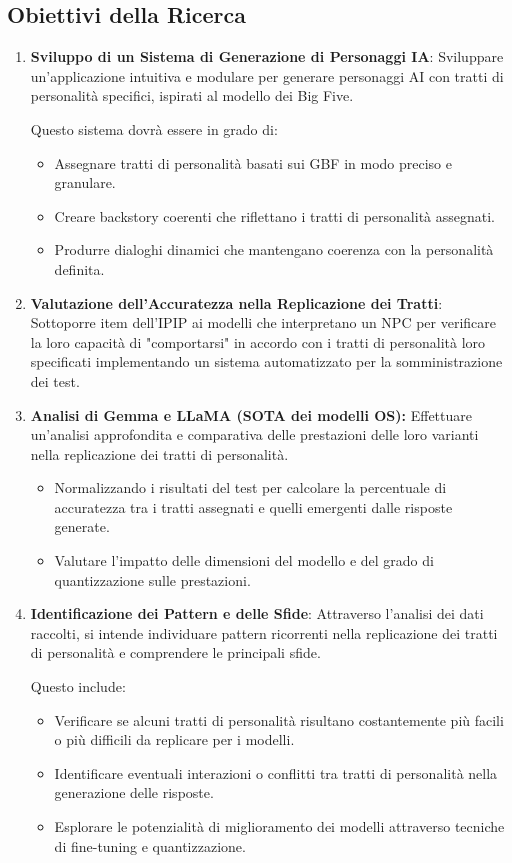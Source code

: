 \subsection{Obiettivi della Ricerca}
\begin{enumerate}
    \item 
    \textbf{Sviluppo di un Sistema di Generazione di Personaggi IA}:
    Sviluppare un'applicazione intuitiva e modulare per generare personaggi AI con tratti di personalità specifici, ispirati al modello dei Big Five.
    
    Questo sistema dovrà essere in grado di:
    \begin{itemize}
        \item Assegnare tratti di personalità basati sui GBF in modo preciso e granulare.
        \item Creare backstory coerenti che riflettano i tratti di personalità assegnati.
        \item Produrre dialoghi dinamici che mantengano coerenza con la personalità definita.
    \end{itemize}
    
    \item 
    \textbf{Valutazione dell'Accuratezza nella Replicazione dei Tratti}:
    Sottoporre item dell'IPIP ai modelli che interpretano un NPC per verificare la loro capacità di "comportarsi" in accordo con i tratti di personalità loro specificati implementando un sistema automatizzato per la somministrazione dei test.
    
    \item 
    \textbf{Analisi di Gemma e LLaMA (SOTA dei modelli OS):}
    Effettuare un'analisi approfondita e comparativa delle prestazioni delle loro varianti nella replicazione dei tratti di personalità.
    \begin{itemize}
        \item Normalizzando i risultati del test per calcolare la percentuale di accuratezza tra i tratti assegnati e quelli emergenti dalle risposte generate.
        \item Valutare l'impatto delle dimensioni del modello e del grado di quantizzazione sulle prestazioni.
    \end{itemize}
    
    \item \textbf{Identificazione dei Pattern e delle Sfide}:
    Attraverso l'analisi dei dati raccolti, si intende individuare pattern ricorrenti nella replicazione dei tratti di personalità e comprendere le principali sfide.
    
    Questo include:
    \begin{itemize}
        \item Verificare se alcuni tratti di personalità risultano costantemente più facili o più difficili da replicare per i modelli.
        \item Identificare eventuali interazioni o conflitti tra tratti di personalità nella generazione delle risposte.
        \item Esplorare le potenzialità di miglioramento dei modelli attraverso tecniche di fine-tuning e quantizzazione.
    \end{itemize}    
\end{enumerate}
